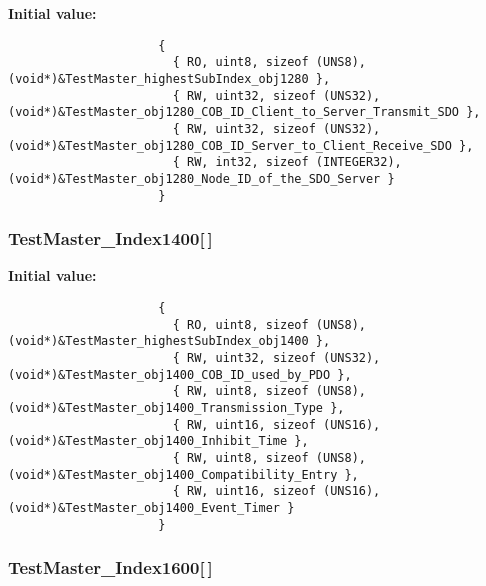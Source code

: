 \textbf{Initial value:}

\begin{Code}\begin{verbatim} 
                     {
                       { RO, uint8, sizeof (UNS8), (void*)&TestMaster_highestSubIndex_obj1280 },
                       { RW, uint32, sizeof (UNS32), (void*)&TestMaster_obj1280_COB_ID_Client_to_Server_Transmit_SDO },
                       { RW, uint32, sizeof (UNS32), (void*)&TestMaster_obj1280_COB_ID_Server_to_Client_Receive_SDO },
                       { RW, int32, sizeof (INTEGER32), (void*)&TestMaster_obj1280_Node_ID_of_the_SDO_Server }
                     }
\end{verbatim}\end{Code}
\subsubsection{ {\bf Test\-Master\_\-Index1400}[$\,$]}\label{TestMasterMicroMod_2TestMaster_8c_964e58fce023577425f5a5351c894da9}


\textbf{Initial value:}

\begin{Code}\begin{verbatim} 
                     {
                       { RO, uint8, sizeof (UNS8), (void*)&TestMaster_highestSubIndex_obj1400 },
                       { RW, uint32, sizeof (UNS32), (void*)&TestMaster_obj1400_COB_ID_used_by_PDO },
                       { RW, uint8, sizeof (UNS8), (void*)&TestMaster_obj1400_Transmission_Type },
                       { RW, uint16, sizeof (UNS16), (void*)&TestMaster_obj1400_Inhibit_Time },
                       { RW, uint8, sizeof (UNS8), (void*)&TestMaster_obj1400_Compatibility_Entry },
                       { RW, uint16, sizeof (UNS16), (void*)&TestMaster_obj1400_Event_Timer }
                     }
\end{verbatim}\end{Code}
\subsubsection{ {\bf Test\-Master\_\-Index1600}[$\,$]}\label{TestMasterMicroMod_2TestMaster_8c_6ce5637d61d70f45288c5cb4477af15d}


